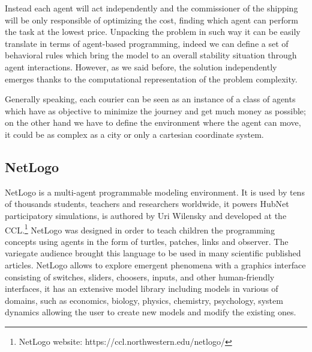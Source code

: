 \documentclass[11pt,a4paper]{article}
\begin{document}
Instead each agent will act independently and the commissioner of the shipping will be only responsible of optimizing the cost, finding which agent can perform the task at the lowest price.
Unpacking the problem in such way it can be easily translate in terms of agent-based programming, indeed we can define a set of behavioral rules which bring the model to an overall stability situation through agent interactions.
However, as we said before, the solution independently emerges thanks to the computational representation of the problem complexity. 

Generally speaking, each courier can be seen as an instance of a class of agents which have as objective to minimize the journey and get much money as possible; on the other hand we have to define the environment where the agent can move, it could be as complex as a city or only a cartesian coordinate system.



\newpage
\subsection{NetLogo}
\begin{figure}[h!]
\centering
\end{figure}
NetLogo is a multi-agent programmable modeling environment. 
It is used by tens of thousands students, teachers and researchers worldwide, it powers HubNet participatory simulations, is authored by Uri Wilensky and developed at the CCL.\footnote{NetLogo website: https://ccl.northwestern.edu/netlogo/} 
NetLogo was designed in order to teach children the programming concepts using agents in the form of turtles, patches, links and observer. 
The variegate audience brought this language to be used in many scientific published articles.
NetLogo allows to explore emergent phenomena with a graphics interface consisting of switches, sliders, choosers, inputs, and other human-friendly interfaces, it has an extensive model library including models in various of domains, such as economics, biology, physics, chemistry, psychology, system dynamics allowing the user to create new models and modify the existing ones. 
\end{document}
